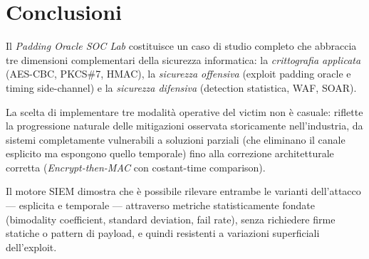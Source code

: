 \documentclass[12pt,a4paper]{article}
\begin{document}
\section{Conclusioni}

Il \emph{Padding Oracle SOC Lab} costituisce un caso di studio completo che abbraccia
tre dimensioni complementari della sicurezza informatica: la \emph{crittografia applicata}
(AES-CBC, PKCS\#7, HMAC), la \emph{sicurezza offensiva} (exploit padding oracle e
timing side-channel) e la \emph{sicurezza difensiva} (detection statistica, WAF, SOAR).

La scelta di implementare tre modalità operative del victim non è casuale: riflette
la progressione naturale delle mitigazioni osservata storicamente nell'industria,
da sistemi completamente vulnerabili a soluzioni parziali (che eliminano il canale
esplicito ma espongono quello temporale) fino alla correzione architetturale corretta
(\emph{Encrypt-then-MAC} con costant-time comparison).

Il motore SIEM dimostra che è possibile rilevare entrambe le varianti dell'attacco
— esplicita e temporale — attraverso metriche statisticamente fondate (bimodality
coefficient, standard deviation, fail rate), senza richiedere firme statiche o
pattern di payload, e quindi resistenti a variazioni superficiali dell'exploit.
\end{document}
